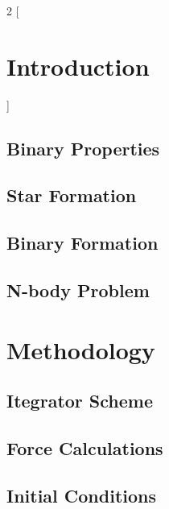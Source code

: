 \documentclass[11pt]{article}
\begin{document}
\begin{titlepage}
    \maketitle
    \begin{abstract}
        \noindent
        \lipsum[1]
    \end{abstract}
    \vspace*{\fill}
    \tableofcontents
    \thispagestyle{empty}
\end{titlepage}


\begin{multicols}{2}
[
    \section{Introduction}
    { \lipsum[1] }
]
\subsection{Binary Properties}

{ \lipsum[1-2] }

\subsection{Star Formation}

{ \lipsum[1] }

\subsection{Binary Formation}

{ \lipsum[1] }

\subsection{N-body Problem}

{ \lipsum[1] }


\section{Methodology}

{ \lipsum[1] }

\subsection{Itegrator Scheme}

{ \lipsum[1] }

\subsection{Force Calculations}

{ \lipsum[1] }

\subsection{Initial Conditions}

{ \lipsum[1] }
\end{multicols}
\end{document}
